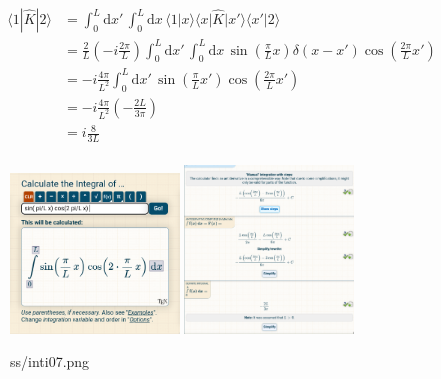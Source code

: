 \documentclass[letter]{article}
\begin{document}
\begin{align*}
	\langle 1 | \hat{K} | 2 \rangle &= 
\int_{0}^{L}  \mathrm{d}x' \,
\int_{0}^{L} \mathrm{d} x \, 
\langle 1 | x \rangle 
\langle x |  \hat{K} | x' \rangle  
\langle x' |  2\rangle 
	\\ &=  \frac{2}{L} \left(-i \frac{2\pi}{L}\right)
\int_{0}^{L}  \mathrm{d}x' \,
\int_{0}^{L} \mathrm{d} x \, 
\sin\left(\frac{\pi}{L} x\right)
\delta(x-x')
\cos\left(\frac{2\pi}{L} x'\right)
\\
&= 
-i \frac{4 \pi }{L^2} \int_{0}^{L} \mathrm{d} x' \, 
\sin\left(\frac{\pi}{L}x'\right) \cos\left(\frac{2\pi}{L}x'\right)
\\
&= 
-i \frac{4 \pi }{L^2} \left(- \frac{2L}{3 \pi }\right)\\
&= 
i \frac{8}{3L}
\\
\end{align*}

\begin{figure}[H]
	\centering
	\includegraphics[width=0.4\textwidth]{ss/inti06.png}
	\includegraphics[width=0.4\textwidth]{ss/inti07.png}
	\caption{ss/inti07.png}
	\label{fig:ss-inti07-png}
\end{figure}
\end{document}
